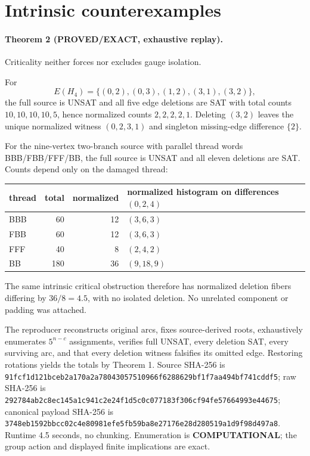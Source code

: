 \documentclass[11pt]{article}
\begin{document}
\section{Intrinsic counterexamples}
\paragraph{Theorem 2 (PROVED/EXACT, exhaustive replay).}
Criticality neither forces nor excludes gauge isolation.

For
\[
E(H_4)=\{(0,2),(0,3),(1,2),(3,1),(3,2)\},
\]
the full source is UNSAT and all five edge deletions are SAT with total counts $10,10,10,10,5$, hence normalized counts $2,2,2,2,1$.  Deleting $(3,2)$ leaves the unique normalized witness $(0,2,3,1)$ and singleton missing-edge difference $\{2\}$.

For the nine-vertex two-branch source with parallel thread words BBB/FBB/FFF/BB, the full source is UNSAT and all eleven deletions are SAT.  Counts depend only on the damaged thread:
\begin{center}\begin{tabular}{lrrl}\toprule
thread&total&normalized&normalized histogram on differences $(0,2,4)$\\\midrule
BBB&60&12&$(3,6,3)$\\
FBB&60&12&$(3,6,3)$\\
FFF&40&8&$(2,4,2)$\\
BB&180&36&$(9,18,9)$\\\bottomrule
\end{tabular}\end{center}
The same intrinsic critical obstruction therefore has normalized deletion fibers differing by $36/8=4.5$, with no isolated deletion.  No unrelated component or padding was attached.

The reproducer reconstructs original arcs, fixes source-derived roots, exhaustively enumerates $5^{n-c}$ assignments, verifies full UNSAT, every deletion SAT, every surviving arc, and that every deletion witness falsifies its omitted edge.  Restoring rotations yields the totals by Theorem 1.  Source SHA-256 is \texttt{91fcf1d121bceb2a170a2a78043057510966f6288629bf1f7aa494bf741cddf5}; raw SHA-256 is \texttt{292784ab2c8ec145a1c941c2e24f1d5c0c077183f306cf94fe57664993e44675}; canonical payload SHA-256 is \texttt{3748eb1592bbcc02c4e80981efe5fb59ba8e27176e28d280519a1d9f98d497a8}.  Runtime 4.5 seconds, no chunking.  Enumeration is \textbf{COMPUTATIONAL}; the group action and displayed finite implications are exact.
\end{document}
